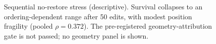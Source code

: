 \begin{figure}[tb]
\centering

\caption{Sequential no-restore stress (descriptive). Survival collapses to an
ordering-dependent range after 50 edits, with modest position fragility (pooled
$\rho{=}0.372$). The pre-registered
geometry-attribution gate is not passed; no geometry panel is shown.}
\label{fig:sequential}
\end{figure}
